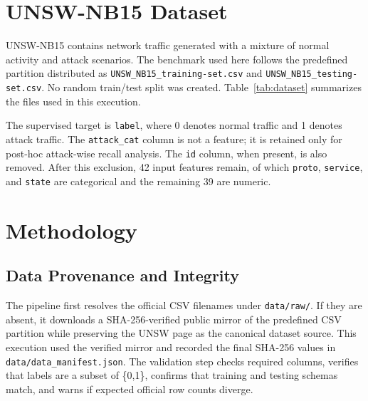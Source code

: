\documentclass[conference]{IEEEtran}
\begin{document}
\section{UNSW-NB15 Dataset}
UNSW-NB15 contains network traffic generated with a mixture of normal activity and attack scenarios. The benchmark used here follows the predefined partition distributed as \texttt{UNSW\_NB15\_training-set.csv} and \texttt{UNSW\_NB15\_testing-set.csv}. No random train/test split was created. Table~\ref{tab:dataset} summarizes the files used in this execution.

\begin{table}[htbp]
\caption{Dataset partition and integrity metadata}
\label{tab:dataset}
\centering
{}
\end{table}

The supervised target is \texttt{label}, where 0 denotes normal traffic and 1 denotes attack traffic. The \texttt{attack\_cat} column is not a feature; it is retained only for post-hoc attack-wise recall analysis. The \texttt{id} column, when present, is also removed. After this exclusion, 42 input features remain, of which \texttt{proto}, \texttt{service}, and \texttt{state} are categorical and the remaining 39 are numeric.

\section{Methodology}
\subsection{Data Provenance and Integrity}
The pipeline first resolves the official CSV filenames under \texttt{data/raw/}. If they are absent, it downloads a SHA-256-verified public mirror of the predefined CSV partition while preserving the UNSW page as the canonical dataset source. This execution used the verified mirror and recorded the final SHA-256 values in \texttt{data/data\_manifest.json}. The validation step checks required columns, verifies that labels are a subset of \{0,1\}, confirms that training and testing schemas match, and warns if expected official row counts diverge.
\end{document}
